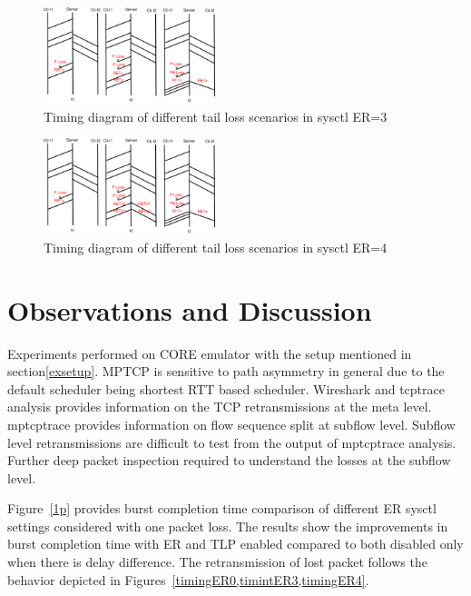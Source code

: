\documentclass[10pt,draftcls,twocolumn]{IEEEconf}
\begin{document}
\begin{figure}[!ht]
\begin{center}
\includegraphics[angle=0, width=0.45\textwidth, natwidth=610, natheight=400]{images/timingER3.pdf}
\end{center}
\caption{Timing diagram of different tail loss scenarios in sysctl ER=3}\label{timingER3}
\end{figure}

\begin{figure}[!ht]
\begin{center}
\includegraphics[angle=0, width=0.45\textwidth, natwidth=610, natheight=400]{images/timingER4.pdf}
\end{center}
\caption{Timing diagram of different tail loss scenarios in sysctl ER=4}\label{timingER4}
\end{figure}






\section{Observations and Discussion}\label{disc}

Experiments performed on CORE emulator with the setup mentioned in section\ref{exsetup}.
MPTCP is sensitive to path asymmetry in general due to the default scheduler being shortest RTT based scheduler. Wireshark and tcptrace
analysis provides information on the TCP retransmissions at the meta level. mptcptrace provides information on flow sequence split at 
subflow level. Subflow level retransmissions are difficult to test from the output of mptcptrace analysis. Further deep packet inspection
required to understand the losses at the subflow level. 


Figure~\ref{1p} provides burst completion time comparison of different ER sysctl settings considered with one packet loss. The results show the improvements
in burst completion time with ER and TLP enabled compared to both disabled only when there is delay difference. The retransmission of lost packet follows the behavior 
depicted in Figures~\ref{timingER0,timintER3,timingER4}.
\end{document}
